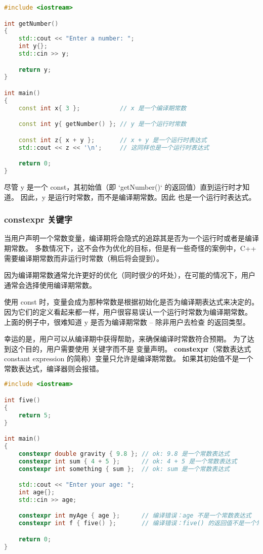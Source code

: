 \documentclass[../../LearnCpp.tex]{subfiles}
\begin{document}
\begin{lstlisting}[language=C++]
#include <iostream>

int getNumber()
{
    std::cout << "Enter a number: ";
    int y{};
    std::cin >> y;

    return y;
}

int main()
{
    const int x{ 3 };           // x 是一个编译期常数

    const int y{ getNumber() }; // y 是一个运行时常数

    const int z{ x + y };       // x + y 是一个运行时表达式
    std::cout << z << '\n';     // 这同样也是一个运行时表达式

    return 0;
}
\end{lstlisting}

尽管 y 是一个 const，其初始值（即 `getNumber()` 的返回值）直到运行时才知道。
因此，y 是运行时常数，而不是编译期常数。因此  也是一个运行时表达式。

\subsubsection*{constexpr 关键字}

当用户声明一个常数变量，编译期将会隐式的追踪其是否为一个运行时或者是编译期常数。
多数情况下，这不会作为优化的目标，但是有一些奇怪的案例中，C++ 需要编译期常数而非运行时常数（稍后将会提到）。

因为编译期常数通常允许更好的优化（同时很少的坏处），在可能的情况下，用户通常会选择使用编译期常数。

使用 const 时，变量会成为那种常数是根据初始化是否为编译期表达式来决定的。
因为它们的定义看起来都一样，用户很容易误认一个运行时常数为编译期常数。
上面的例子中，很难知道 y 是否为编译期常数 -- 除非用户去检查  的返回类型。

幸运的是，用户可以从编译期中获得帮助，来确保编译时常数符合预期。
为了达到这个目的，用户需要使用  关键字而不是  变量声明。
\textbf{constexpr}（常数表达式 constant expression 的简称）变量只允许是编译期常数。
如果其初始值不是一个常数表达式，编译器则会报错。

\begin{lstlisting}[language=C++]
#include <iostream>

int five()
{
    return 5;
}

int main()
{
    constexpr double gravity { 9.8 }; // ok: 9.8 是一个常数表达式
    constexpr int sum { 4 + 5 };      // ok: 4 + 5 是一个常数表达式
    constexpr int something { sum };  // ok: sum 是一个常数表达式

    std::cout << "Enter your age: ";
    int age{};
    std::cin >> age;

    constexpr int myAge { age };      // 编译错误：age 不是一个常数表达式
    constexpr int f { five() };       // 编译错误：five() 的返回值不是一个常数表达式

    return 0;
}
\end{lstlisting}
\end{document}
